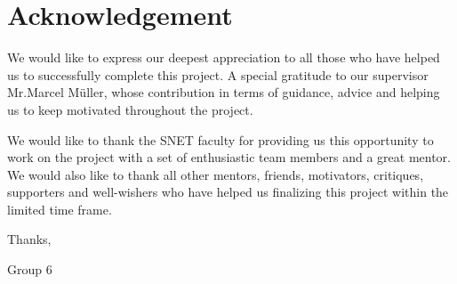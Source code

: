 \chapter*{Acknowledgement}
\label{cha:acknowledgments}
\vspace{20 mm}

We would like to express our deepest appreciation to all those who have helped us to successfully complete this project. A special gratitude to our supervisor Mr.Marcel Müller, whose contribution in terms of guidance, advice and helping us to keep motivated throughout the project. 


We would like to thank the SNET faculty for providing us this opportunity to work on the project with a set of enthusiastic team members and a great mentor. We would also like to thank all other mentors, friends, motivators, critiques, supporters and well-wishers who have helped us finalizing this project within the limited time frame. 

\vspace{20 mm}
\noindent Thanks, 
\vspace{2 mm}

\noindent Group 6


